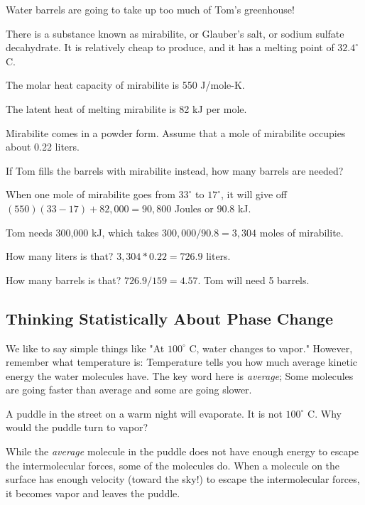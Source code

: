 \begin{Exercise}[title={Using Mirabilite For Thermal Energy Storage}, label=mirabilite]

Water barrels are going to take up too much of Tom's greenhouse!

There is a substance known as mirabilite, or Glauber's salt, or sodium sulfate decahydrate. It is relatively cheap to produce, and it has a melting point of $32.4^\circ$ C.

The molar heat capacity of mirabilite is 550 J/mole-K.

The latent heat of melting mirabilite is 82 kJ per mole.

Mirabilite comes in a powder form. Assume that a mole of mirabilite occupies about 0.22 liters.

If Tom fills the barrels with mirabilite instead, how many barrels are needed?

\end{Exercise}
\begin{Answer}[ref=mirabilite] 

When one mole of mirabilite goes from $33^\circ$ to $17^\circ$, it will give off $(550)(33-17) + 82,000 = 90,800$ Joules or $90.8$ kJ. 

Tom needs 300,000 kJ, which takes $300,000/90.8 =  3,304$ moles of mirabilite.

How many liters is that? $3,304 * 0.22 = 726.9$ liters.

How many barrels is that? $726.9 / 159 = 4.57$. Tom will need 5 barrels.
 
\end{Answer}

\subsection{Thinking Statistically About Phase Change}

We like to say simple things like "At $100^\circ$ C, water changes to vapor." However, remember what
temperature is: Temperature tells you how much average kinetic energy the water molecules have.  The key word here is \emph{average}; Some molecules are going faster than average and some are going slower.

A puddle in the street on a warm night will evaporate. It is not $100^\circ$ C. Why would the puddle turn to vapor?

While the \emph{average} molecule in the puddle does not have enough energy to escape the intermolecular forces, some of the molecules do. When a molecule on the surface has enough velocity (toward the sky!) to escape the intermolecular forces, it becomes vapor and leaves the puddle.

